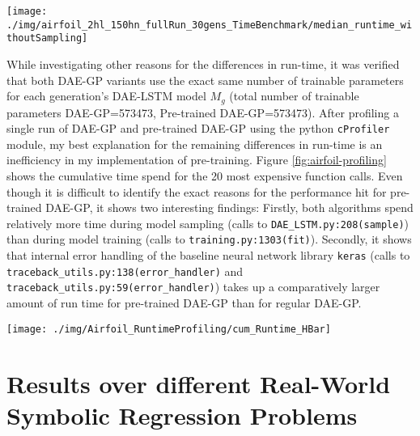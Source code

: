 \documentclass[
  11pt,
]{article}
\let\origfigure\figure
\let\endorigfigure\endfigure
\renewenvironment{figure}[1][2] {
    \expandafter\origfigure\expandafter[H]
} {
    \endorigfigure
}
\begin{document}
\begin{figure}[c]

{\centering \texttt{[image: ./img/airfoil\_2hl\_150hn\_fullRun\_30gens\_TimeBenchmark/median\_runtime\_withoutSampling]} 

}

\caption{Median Runtime excluding Time for Sampling - Airfoil}\label{fig:airfoil-runtime-noSampling-total}
\end{figure}

While investigating other reasons for the differences in run-time, it was verified that both DAE-GP variants use the exact same number of trainable parameters for each generation's DAE-LSTM model \(M_g\) (total number of trainable parameters DAE-GP=573473, Pre-trained DAE-GP=573473).
After profiling a single run of DAE-GP and pre-trained DAE-GP using the python \texttt{cProfiler} module, my best explanation for the remaining differences in run-time is an inefficiency in my implementation of pre-training.
Figure \ref{fig:airfoil-profiling} shows the cumulative time spend for the 20 most expensive function calls.
Even though it is difficult to identify the exact reasons for the performance hit for pre-trained DAE-GP, it shows two interesting findings: Firstly, both algorithms spend relatively more time during model sampling (calls to \texttt{DAE\_LSTM.py:208(sample)}) than during model training (calls to \texttt{training.py:1303(fit)}).
Secondly, it shows that internal error handling of the baseline neural network library \texttt{keras} (calls to \texttt{traceback\_utils.py:138(error\_handler)} and \texttt{traceback\_utils.py:59(error\_handler)}) takes up a comparatively larger amount of run time for pre-trained DAE-GP than for regular DAE-GP.

\begin{figure}[c]

{\centering \texttt{[image: ./img/Airfoil\_RuntimeProfiling/cum\_Runtime\_HBar]} 

}

\caption{Cumulative Time consumption by Function Calls (Top 20) - Airfoil}\label{fig:airfoil-profiling}
\end{figure}

\hypertarget{results-over-different-real-world-symbolic-regression-problems}{%
\section{Results over different Real-World Symbolic Regression Problems}\label{results-over-different-real-world-symbolic-regression-problems}}
\end{document}
